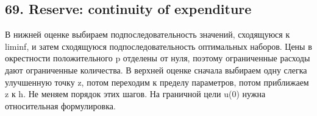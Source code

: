 \documentclass[11pt,a4paper]{article}
\begin{document}
\subsection*{69. Reserve: continuity of expenditure}
В нижней оценке выбираем подпоследовательность значений, сходящуюся к liminf, и затем сходящуюся подпоследовательность оптимальных наборов. Цены в окрестности положительного p отделены от нуля, поэтому ограниченные расходы дают ограниченные количества. В верхней оценке сначала выбираем одну слегка улучшенную точку z, потом переходим к пределу параметров, потом приближаем z к h. Не меняем порядок этих шагов. На граничной цели u(0) нужна относительная формулировка.
\end{document}
